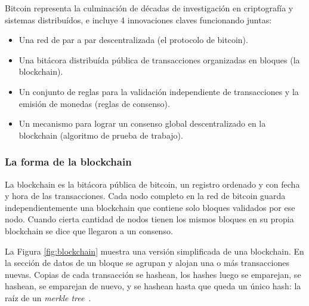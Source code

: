 
Bitcoin representa la culminación de décadas de investigación en criptografía
y sistemas distribuídos, e incluye 4 innovaciones claves funcionando juntas:
\begin{itemize}
  \item Una red de par a par descentralizada (el protocolo de bitcoin).
  \item Una bitácora distribuída pública de transacciones organizadas en bloques (la blockchain).
  \item Un conjunto de reglas para la validación independiente de transacciones y la emisión de monedas (reglas de consenso).
  \item Un mecanismo para lograr un consenso global descentralizado en la blockchain (algoritmo de prueba de trabajo).
\end{itemize}

\subsubsection{La forma de la blockchain}

La blockchain es la bitácora pública de bitcoin, un registro ordenado y con fecha y hora de las transacciones.
Cada nodo completo en la red de bitcoin guarda independientemente una blockchain que contiene solo
bloques validados por ese nodo. Cuando cierta cantidad de nodos tienen los mismos bloques en su propia blockchain
se dice que llegaron a un consenso. 

La Figura \ref{fig:blockchain} muestra una versión simplificada de una blockchain. En la sección de datos de un bloque
se agrupan y alojan una o más transacciones nuevas. Copias de cada transacción se hashean, los hashes luego
se emparejan, se hashean, se emparejan de nuevo, y se hashean hasta que queda un único hash: la raíz de un
\textit{merkle tree}~\cite{merkle.tree}. 

